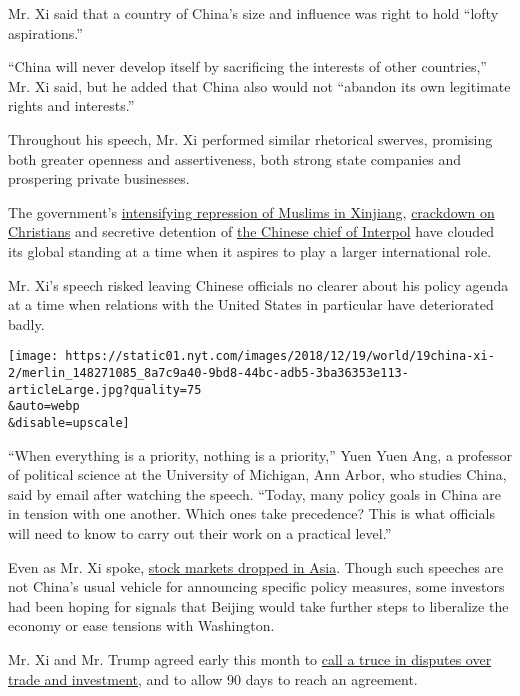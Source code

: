 Mr. Xi said that a country of China's size and influence was right to
hold ``lofty aspirations.''

``China will never develop itself by sacrificing the interests of other
countries,'' Mr. Xi said, but he added that China also would not
``abandon its own legitimate rights and interests.''

Throughout his speech, Mr. Xi performed similar rhetorical swerves,
promising both greater openness and assertiveness, both strong state
companies and prospering private businesses.

The government's
\href{https://www.nytimes.com/2018/12/16/world/asia/xinjiang-china-forced-labor-camps-uighurs.html}{intensifying
repression of Muslims in Xinjiang},
\href{https://www.nytimes.com/2018/12/13/world/asia/china-religion-crackdown.html}{crackdown
on Christians} and secretive detention of
\href{https://www.nytimes.com/2018/10/05/world/europe/meng-hongwei-missing-interpol.html}{the
Chinese chief of Interpol} have clouded its global standing at a time
when it aspires to play a larger international role.

Mr. Xi's speech risked leaving Chinese officials no clearer about his
policy agenda at a time when relations with the United States in
particular have deteriorated badly.

\texttt{[image: https://static01.nyt.com/images/2018/12/19/world/19china-xi-2/merlin\_148271085\_8a7c9a40-9bd8-44bc-adb5-3ba36353e113-articleLarge.jpg?quality=75\\\&auto=webp\\\&disable=upscale]}

``When everything is a priority, nothing is a priority,'' Yuen Yuen Ang,
a professor of political science at the University of Michigan, Ann
Arbor, who studies China, said by email after watching the speech.
``Today, many policy goals in China are in tension with one another.
Which ones take precedence? This is what officials will need to know to
carry out their work on a practical level.''

Even as Mr. Xi spoke,
\href{https://www.nytimes.com/2018/12/18/business/stock-markets.html}{stock
markets dropped in Asia}. Though such speeches are not China's usual
vehicle for announcing specific policy measures, some investors had been
hoping for signals that Beijing would take further steps to liberalize
the economy or ease tensions with Washington.

Mr. Xi and Mr. Trump agreed early this month to
\href{https://www.nytimes.com/2018/12/01/world/trump-xi-g20-merkel.html}{call
a truce in disputes over trade and investment}, and to allow 90 days to
reach an agreement.

